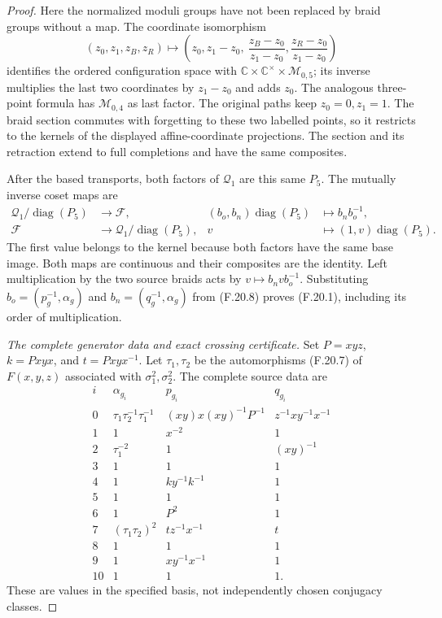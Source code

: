 \begin{proof}
Here the normalized moduli groups have not been replaced
by braid groups without a map. The coordinate isomorphism
\[
 (z_0,z_1,z_B,z_R)\longmapsto
 \left(z_0,z_1-z_0,\
       \frac{z_B-z_0}{z_1-z_0},
       \frac{z_R-z_0}{z_1-z_0}\right)
                                                               \tag{F.20.10}
\]
identifies the ordered configuration space with
$\mathbb C\times\mathbb C^\times\times\mathcal M_{0,5}$;
its inverse multiplies the last two coordinates by
$z_1-z_0$ and adds $z_0$.
The analogous three-point formula has
$\mathcal M_{0,4}$ as last factor.
The original paths keep $z_0=0,z_1=1$.
The braid section commutes with forgetting to these
two labelled points, so it restricts to the kernels
of the displayed affine-coordinate projections.
The section and its retraction extend to full
completions and have the same composites.

After the based transports, both factors of
$\mathcal Q_1$ are this same $P_5$. The mutually inverse
coset maps are
\[
 \begin{aligned}
 \mathcal Q_1/\operatorname{diag}(P_5)&\longrightarrow\mathcal F,
       &(b_o,b_n)\operatorname{diag}(P_5)&\longmapsto b_nb_o^{-1},\\
 \mathcal F&\longrightarrow
                 \mathcal Q_1/\operatorname{diag}(P_5),
       &v&\longmapsto(1,v)\operatorname{diag}(P_5).
 \end{aligned}                                                \tag{F.20.11}
\]
The first value belongs to the kernel because both
factors have the same base image. Both maps are
continuous and their composites are the identity.
Left multiplication by the two source braids acts
by $v\mapsto b_nvb_o^{-1}$.
Substituting $b_o=(p_g^{-1},\alpha_g)$ and
$b_n=(q_g^{-1},\alpha_g)$ from (F.20.8) proves
(F.20.1), including its order of multiplication.

\emph{The complete generator data and exact crossing certificate.}
Set $P=xyz$, $k=Pxyx$, and $t=Pxyx^{-1}$.
Let $\tau_1,\tau_2$ be the automorphisms (F.20.7)
of $F(x,y,z)$ associated with $\sigma_1^2,\sigma_2^2$.
The complete source data are
\[
\begin{array}{c|c|c|c}
i&\alpha_{g_i}&p_{g_i}&q_{g_i}\\ \hline
0&\tau_1\tau_2^{-1}\tau_1^{-1}
  &(xy)x(xy)^{-1}P^{-1}&z^{-1}xy^{-1}x^{-1}\\
1&1&x^{-2}&1\\
2&\tau_1^{-2}&1&(xy)^{-1}\\
3&1&1&1\\
4&1&ky^{-1}k^{-1}&1\\
5&1&1&1\\
6&1&P^2&1\\
7&(\tau_1\tau_2)^2&tz^{-1}x^{-1}&t\\
8&1&1&1\\
9&1&xy^{-1}x^{-1}&1\\
10&1&1&1 .
\end{array}                                                   \tag{F.20.12}
\]
These are values in the specified basis, not
independently chosen conjugacy classes.


\end{proof}
